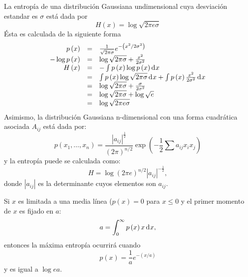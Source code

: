 \item{La entrop\'ia de una distribuci\'on Gaussiana undimensional cuya desviaci\'on estandar es $\sigma$ est\'a dada por
\begin{equation}
H\left ( x \right )=\log \sqrt{2\pi e\sigma }
\end{equation}
\'Esta es calculada de la siguiente forma
\begin{equation}
\begin{array}{rcl}
p\left ( x \right ) &=&
\frac{1}{\sqrt{2\pi \sigma }}e^{-\left ( x^{2}/2\sigma ^{2} \right )} \\
-\log p\left ( x \right )
&=& 
\log \sqrt{2\pi \sigma }+\frac{x^{2}}{2\sigma ^{2}} \\
H\left ( x \right )
&=&
-\int p\left ( x \right )\log p\left ( x \right ) \diff x \\
&=&
\int p\left ( x \right )\log \sqrt{2\pi \sigma } \diff x +\int p\left ( x \right )\frac{x^{2}}{2\sigma ^{2}} \diff x  \\
&=& \log \sqrt{2\pi \sigma }+\frac{\sigma }{2\sigma ^{2}} \\
&=& \log \sqrt{2\pi \sigma }+\log \sqrt{e} \\
&=&\log \sqrt{2\pi e \sigma }
\end{array}
\end{equation}
Asimismo, la distribuci\'on Gaussiana n-dimensional con una forma cuadr\'atica asociada $A_{ij}$ est\'a dada por:
\begin{equation}
p\left ( x_{1}, \ldots ,x_{n} \right )=\frac{\left | a_{ij} \right |^{\frac{1}{2}}}{\left ( 2\pi  \right )^{n/2}}\exp \left ( -\frac{1}{2} \sum a_{ij}x_{i}x_{j} \right)
\end{equation}
y la entrop\'ia puede se calculada como:
\begin{equation}
H=\log \left ( 2\pi e \right )^{n/2}\left | a_{ij} \right |^{-\frac{1}{2}},
\end{equation}
donde $\left |a_{ij}  \right | $ es la determinante cuyos elementos son $a_{ij}$.}
\item{Si $x$ es limitada a una media l\'inea ($p\left ( x \right )=0$ para $x\leq0$ y el primer momento de $x$ es fijado en $a$:
\begin{equation}
a=\int_{0}^{\infty}p\left ( x \right )x \diff x,
\end{equation}
entonces la m\'axima entrop\'ia ocurrir\'a cuando
\begin{equation}
p\left ( x \right )=\frac{1}{a}e^{-\left ( x/a \right )}
\end{equation}
y es igual a $\log ea$.}
